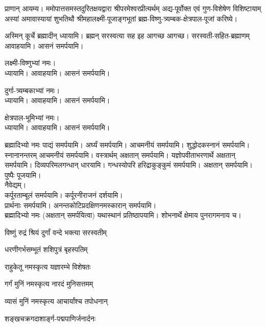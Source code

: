 

प्राणान् आयम्य। ममोपात्तसमस्तदुरितक्षयद्वारा श्रीपरमेश्वरप्रीत्यर्थम् अद्य-पूर्वोक्त एवं गुण-विशेषेण विशिष्टायाम् अस्यां
अमावास्यायां शुभतिथौ श्रीमहालक्ष्मी-पूजाङ्गभूतां ब्रह्म-विष्णु-त्र्यम्बक-क्षेत्रपाल-पूजां करिष्ये।

अस्मिन् कूर्चे ब्रह्मादीन् ध्यायामि। ब्रह्मन् सरस्वत्या सह इह आगच्छ आगच्छ। सरस्वती-सहित-ब्रह्माणम् आवाहयामि। आसनं समर्पयामि।

लक्ष्मी-विष्णुभ्यां नमः।\\
ध्यायामि। आवाहयामि। आसनं समर्पयामि।

दुर्गा-त्र्यम्बकाभ्यां नमः।\\
ध्यायामि। आवाहयामि। आसनं समर्पयामि।

क्षेत्रपाल-भूमिभ्यां नमः।\\
ध्यायामि। आवाहयामि। आसनं समर्पयामि।

ब्रह्मादिभ्यो नमः पाद्यं समर्पयामि। अर्घ्यं समर्पयामि।
आचमनीयं समर्पयामि। शुद्धोदकस्नानं समर्पयामि। स्नानानन्तरम् आचमनीयं समर्पयामि।
वस्त्रार्थम् अक्षतान् समर्पयामि।
यज्ञोपवीताभरणार्थे अक्षतान् समर्पयामि।
दिव्यपरिमलगन्धान् धारयामि।
गन्धस्योपरि हरिद्राकुङ्कुमं समर्पयामि। अक्षतान् समर्पयामि। \\
पुष्पैः पूजयामि।\\

नैवेद्यम्। \\
कर्पूरताम्बूलं समर्पयामि। कर्पूरनीराजनं दर्शयामि।\\
प्रार्थनाः समर्पयामि।
अनन्तकोटिप्रदक्षिणनमस्कारान् समर्पयामि।\\

ब्रह्मादिभ्यो नमः (अक्षतान् समर्पयित्वा) यथास्थानं प्रतिष्ठापयामि। शोभनार्थे क्षेमाय पुनरागमनाय च।


{विष्णुं रुद्रं श्रियं दुर्गां वन्दे भक्त्या सरस्वतीम्}

{धरणीगर्भसम्भूतं शशिपुत्रं बृहस्पतिम्}

{राहुकेतू नमस्कृत्य यज्ञारम्भे विशेषतः}

{गर्गं मुनिं नमस्कृत्य नारदं मुनिसत्तमम्}

{व्यासं मुनिं नमस्कृत्य आचार्यांश्च तपोधनान्}

{शङ्खचक्रगदाशार्ङ्ग-पद्मपाणिर्जनार्दनः}
